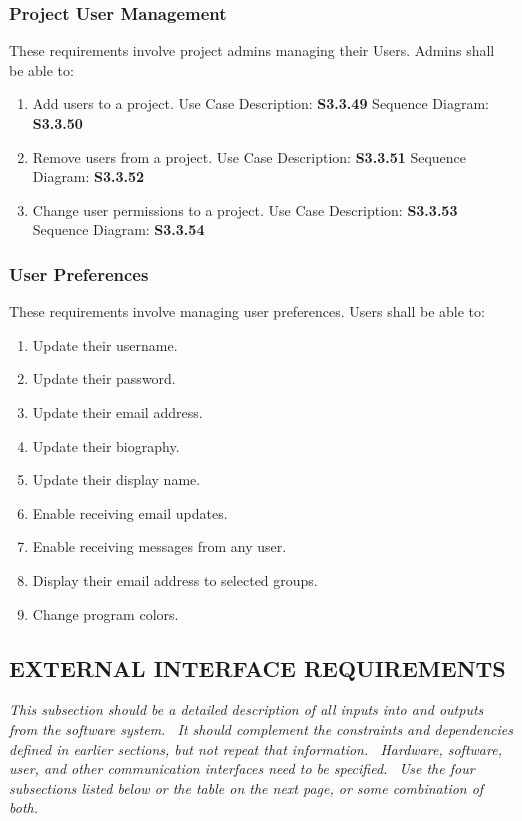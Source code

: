 \documentclass[twoside,letterpaper]{article}
\begin{document}
{\subsubsection{Project User Management}

These requirements involve project admins managing their Users. Admins shall be able to:

\begin{enumerate}
	\item Add users to a project.
    \subitem Use Case Description: \textbf{S3.3.49}
		\subitem Sequence Diagram: \textbf{S3.3.50}
  \item Remove users from a project.
    \subitem Use Case Description: \textbf{S3.3.51}
		\subitem Sequence Diagram: \textbf{S3.3.52}
	\item Change user permissions to a project.
    \subitem Use Case Description: \textbf{S3.3.53}
		\subitem Sequence Diagram: \textbf{S3.3.54}
\end{enumerate}

\subsubsection{User Preferences}

These requirements involve managing user preferences. Users shall be able to:

\begin{enumerate}
	\item Update their username.
	\item Update their password.
	\item Update their email address.
	\item Update their biography.
	\item Update their display name.
	\item Enable receiving email updates.
	\item Enable receiving messages from any user.
	\item Display their email address to selected groups.
	\item Change program colors.
\end{enumerate}

}

\subsection[EXTERNAL INTERFACE REQUIREMENTS]{\rmfamily\bfseries\color{black} EXTERNAL INTERFACE
REQUIREMENTS}
\hypertarget{RefHeading20659017292}{}{\itshape\color{black}
This subsection should be a detailed description of all inputs into and outputs from the software system. \ It should
complement the constraints and dependencies defined in earlier sections, but not repeat that information. \ Hardware,
software, user, and other communication interfaces need to be specified. \ Use the four subsections listed below or the
table on the next page, or some combination of both.}
\end{document}
